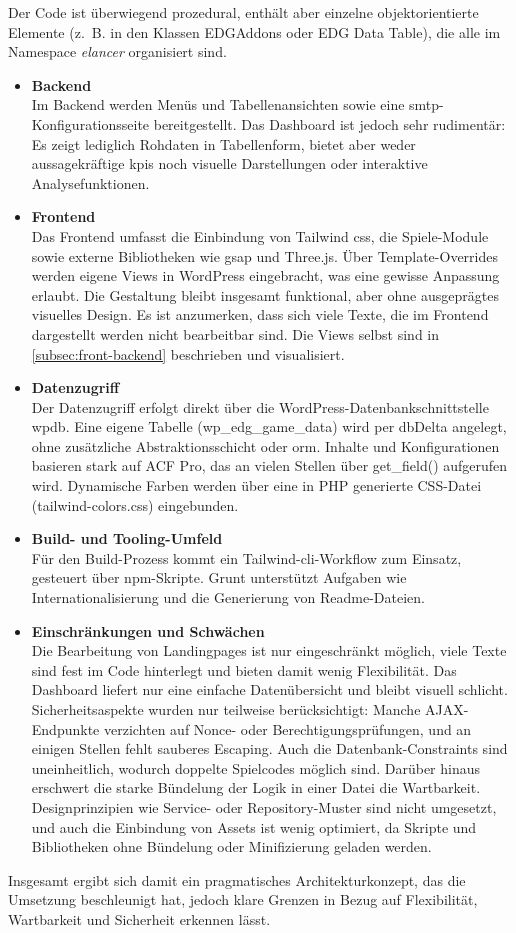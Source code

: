 Der Code ist überwiegend prozedural, enthält aber einzelne objektorientierte Elemente (z.~B. in den Klassen EDGAddons oder EDG Data Table), die alle im Namespace \emph{elancer} organisiert sind.

\begin{itemize}
    \item \textbf{Backend}\\
    Im Backend werden Menüs und Tabellenansichten sowie eine \gls{smtp}-Konfigurationsseite bereitgestellt. Das Dashboard ist jedoch sehr rudimentär: Es zeigt lediglich Rohdaten in Tabellenform, bietet aber weder aussagekräftige \gls{kpi}s noch visuelle Darstellungen oder interaktive Analysefunktionen.

    \item \textbf{Frontend}\\
    Das Frontend umfasst die Einbindung von Tailwind \gls{css}, die Spiele-Module sowie externe Bibliotheken wie \gls{gsap} und Three.js. Über Template-Overrides werden eigene Views in WordPress eingebracht, was eine gewisse Anpassung erlaubt. Die Gestaltung bleibt insgesamt funktional, aber ohne ausgeprägtes visuelles Design. Es ist anzumerken, dass sich viele Texte, die im Frontend dargestellt werden nicht bearbeitbar sind. Die Views selbst sind in \ref{subsec:front-backend} beschrieben und visualisiert.

    \item \textbf{Datenzugriff}\\
    Der Datenzugriff erfolgt direkt über die WordPress-Datenbankschnittstelle wpdb. Eine eigene Tabelle (wp\_edg\_game\_data) wird per dbDelta angelegt, ohne zusätzliche Abstraktionsschicht oder \gls{orm}. Inhalte und Konfigurationen basieren stark auf ACF Pro, das an vielen Stellen über get\_field() aufgerufen wird. Dynamische Farben werden über eine in PHP generierte CSS-Datei (tailwind-colors.css) eingebunden.

    \item \textbf{Build- und Tooling-Umfeld}\\
    Für den Build-Prozess kommt ein Tailwind-\gls{cli}-Workflow zum Einsatz, gesteuert über npm-Skripte. Grunt unterstützt Aufgaben wie Internationalisierung und die Generierung von Readme-Dateien.

    \item \textbf{Einschränkungen und Schwächen}\\
    Die Bearbeitung von Landingpages ist nur eingeschränkt möglich, viele Texte sind fest im Code hinterlegt und bieten damit wenig Flexibilität. Das Dashboard liefert nur eine einfache Datenübersicht und bleibt visuell schlicht. Sicherheitsaspekte wurden nur teilweise berücksichtigt: Manche AJAX-Endpunkte verzichten auf Nonce- oder Berechtigungsprüfungen, und an einigen Stellen fehlt sauberes Escaping. Auch die Datenbank-Constraints sind uneinheitlich, wodurch doppelte Spielcodes möglich sind. Darüber hinaus erschwert die starke Bündelung der Logik in einer Datei die Wartbarkeit. Designprinzipien wie Service- oder Repository-Muster sind nicht umgesetzt, und auch die Einbindung von Assets ist wenig optimiert, da Skripte und Bibliotheken ohne Bündelung oder Minifizierung geladen werden.
\end{itemize}
\vspace{0.5em}
Insgesamt ergibt sich damit ein pragmatisches Architekturkonzept, das die Umsetzung beschleunigt hat, jedoch klare Grenzen in Bezug auf Flexibilität, Wartbarkeit und Sicherheit erkennen lässt.